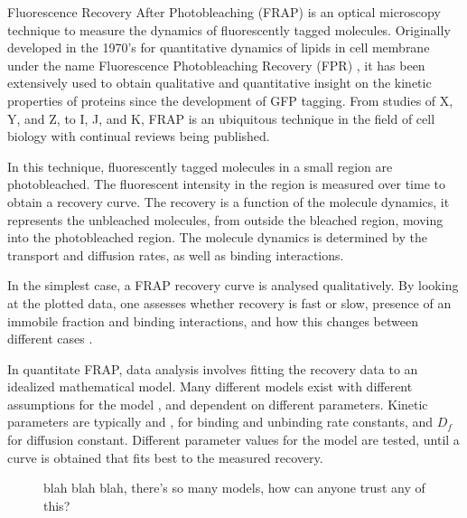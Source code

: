     Fluorescence Recovery After Photobleaching (FRAP) is an optical
    microscopy technique to measure the dynamics of fluorescently
    tagged molecules.
    Originally developed in the 1970's for quantitative dynamics of lipids
    in cell membrane under the name Fluorescence Photobleaching
    Recovery (FPR) \citep{axelrod1976mobility}, it has
    been extensively used to obtain qualitative and quantitative
    insight on the kinetic properties of proteins since the development
    of GFP tagging.
    From studies of X, Y, and Z, to I, J, and K, FRAP is an ubiquitous
    technique in the field of cell biology with continual reviews being
    published.

    In this technique, fluorescently tagged molecules in a small region
    are photobleached.  The fluorescent intensity in the region is
    measured over time to obtain a recovery curve.  The recovery is a
    function of the molecule dynamics, it represents the unbleached
    molecules, from outside the bleached region, moving into the
    photobleached region.  The molecule dynamics is determined by the
    transport and diffusion rates, as well as binding interactions.

    In the simplest case, a FRAP recovery curve is analysed
    qualitatively.  By looking at the plotted data, one assesses
    whether recovery is fast or slow, presence of an immobile
    fraction and binding interactions, and how this changes
    between different cases .

    \begin{figure}
      \centering
      \caption{}
      \label{fig:intro:frap-curve-example}
    \end{figure}

    In quantitate FRAP, data analysis involves fitting the recovery
    data to an idealized mathematical model.
    Many different models exist with different assumptions for the model
    , and dependent on different
    parameters.
    Kinetic parameters are typically \Kon{} and \Koff{}, for
    binding and unbinding rate constants, and $D_{f}$ for diffusion constant.
    Different parameter values for the model are tested, until a curve is
    obtained that fits best to the measured recovery.

    \begin{figure}
      \centering
      \caption{blah blah blah, there's so many models, how can anyone trust
               any of this?}
      \label{fig:intro:frap-model-components}
    \end{figure}

